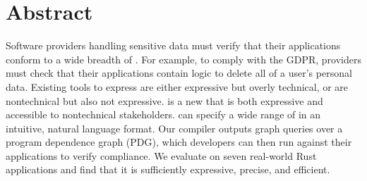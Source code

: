 \section*{Abstract}

%
Software providers handling sensitive data must verify that their applications conform to a wide breadth of \policies.
%
For example, to comply with the GDPR, providers must check that their applications contain logic to delete all of a user's personal data.
% 
Existing tools to express \policies{} are either expressive but overly technical, or are nontechnical but also not expressive.
%
\syslang{} is a new \policylang{} that is both expressive and accessible to nontechnical stakeholders.
%
\syslang{} can specify a wide range of \policies{} in an intuitive, natural language format.
%
Our \syslang{} compiler outputs graph queries over a program dependence graph (PDG),
which developers can then run against their applications to verify compliance.
%
We evaluate \syslang{} on seven real-world Rust applications and find that it is
sufficiently expressive, precise, and efficient.
